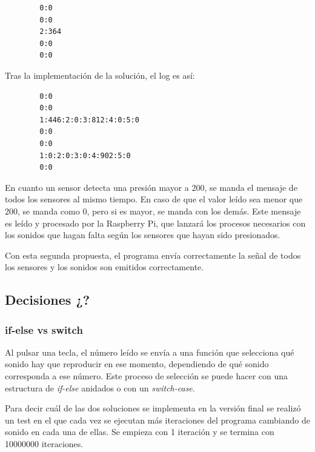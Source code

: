 \documentclass{article}
\begin{document}
        \begin{lstlisting}
        0:0
        0:0
        2:364
        0:0
        0:0
        \end{lstlisting}

        Tras la implementación de la solución, el log es así:

        \begin{lstlisting}
        0:0
        0:0
        1:446:2:0:3:812:4:0:5:0
        0:0
        0:0
        1:0:2:0:3:0:4:902:5:0
        0:0
        \end{lstlisting}

        En cuanto un sensor detecta una presión mayor a 200, se manda el mensaje de todos los sensores al mismo tiempo.
        En caso de que el valor leído sea menor que 200, se manda como 0, pero si es mayor, se manda con los demás. Este
        mensaje es leído y procesado por la Raspberry Pi, que lanzará los procesos necesarios con los sonidos que hagan
        falta según los sensores que hayan sido presionados.\newline

        Con esta segunda propuesta, el programa envía correctamente la señal de todos los sensores y los sonidos son
        emitidos correctamente.


    \subsection{Decisiones ¿?} %
    \label{sub:Decisiones}

        \subsubsection{if-else vs switch} %
        \label{ssub:if-else_vs_switch}

            Al pulsar una tecla, el número leído se envía a una función que selecciona qué sonido hay que reproducir en
            ese momento, dependiendo de qué sonido corresponda a ese número. Este proceso de selección se puede hacer
            con una estructura de \textit{if-else} anidados o con un \textit{switch-case}.\newline

            Para decir cuál de las dos soluciones se implementa en la versión final se realizó un test en el que cada
            vez se ejecutan más iteraciones del programa cambiando de sonido en cada una de ellas. Se empieza con 1
            iteración y se termina con 10000000 iteraciones.\newline
\end{document}
